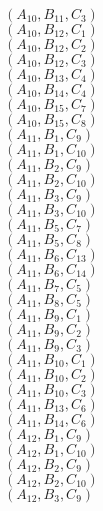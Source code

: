 \documentclass[14pt]{article}
\begin{document}
    $({A}_{10}, {B}_{11}, {C}_{3}) $ \\ 
    $({A}_{10}, {B}_{12}, {C}_{1}) $ \\ 
    $({A}_{10}, {B}_{12}, {C}_{2}) $ \\ 
    $({A}_{10}, {B}_{12}, {C}_{3}) $ \\ 
    $({A}_{10}, {B}_{13}, {C}_{4}) $ \\ 
    $({A}_{10}, {B}_{14}, {C}_{4}) $ \\ 
    $({A}_{10}, {B}_{15}, {C}_{7}) $ \\ 
    $({A}_{10}, {B}_{15}, {C}_{8}) $ \\ 
    $({A}_{11}, {B}_{1}, {C}_{9}) $ \\ 
    $({A}_{11}, {B}_{1}, {C}_{10}) $ \\ 
    $({A}_{11}, {B}_{2}, {C}_{9}) $ \\ 
    $({A}_{11}, {B}_{2}, {C}_{10}) $ \\ 
    $({A}_{11}, {B}_{3}, {C}_{9}) $ \\ 
    $({A}_{11}, {B}_{3}, {C}_{10}) $ \\ 
    $({A}_{11}, {B}_{5}, {C}_{7}) $ \\ 
    $({A}_{11}, {B}_{5}, {C}_{8}) $ \\ 
    $({A}_{11}, {B}_{6}, {C}_{13}) $ \\ 
    $({A}_{11}, {B}_{6}, {C}_{14}) $ \\ 
    $({A}_{11}, {B}_{7}, {C}_{5}) $ \\ 
    $({A}_{11}, {B}_{8}, {C}_{5}) $ \\ 
    $({A}_{11}, {B}_{9}, {C}_{1}) $ \\ 
    $({A}_{11}, {B}_{9}, {C}_{2}) $ \\ 
    $({A}_{11}, {B}_{9}, {C}_{3}) $ \\ 
    $({A}_{11}, {B}_{10}, {C}_{1}) $ \\ 
    $({A}_{11}, {B}_{10}, {C}_{2}) $ \\ 
    $({A}_{11}, {B}_{10}, {C}_{3}) $ \\ 
    $({A}_{11}, {B}_{13}, {C}_{6}) $ \\ 
    $({A}_{11}, {B}_{14}, {C}_{6}) $ \\ 
    $({A}_{12}, {B}_{1}, {C}_{9}) $ \\ 
    $({A}_{12}, {B}_{1}, {C}_{10}) $ \\ 
    $({A}_{12}, {B}_{2}, {C}_{9}) $ \\ 
    $({A}_{12}, {B}_{2}, {C}_{10}) $ \\ 
    $({A}_{12}, {B}_{3}, {C}_{9}) $ \\ 
\end{document}
